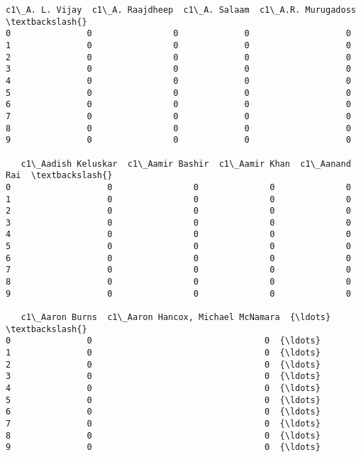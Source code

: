 \documentclass[11pt]{article}
\makeatletter
\newcommand{\boxspacing}{\kern\kvtcb@left@rule\kern\kvtcb@boxsep}
\newcommand{\prompt}[4]{
        {\ttfamily\llap{{\color{#2}[#3]:\hspace{3pt}#4}}\vspace{-\baselineskip}}
    }
\makeatother
\begin{document}
            \begin{tcolorbox}[breakable, size=fbox, boxrule=.5pt, pad at break*=1mm, opacityfill=0]
\prompt{Out}{outcolor}{78}{\boxspacing}
\begin{Verbatim}[commandchars=\\\{\}]
   c1\_A. L. Vijay  c1\_A. Raajdheep  c1\_A. Salaam  c1\_A.R. Murugadoss  \textbackslash{}
0               0                0             0                   0
1               0                0             0                   0
2               0                0             0                   0
3               0                0             0                   0
4               0                0             0                   0
5               0                0             0                   0
6               0                0             0                   0
7               0                0             0                   0
8               0                0             0                   0
9               0                0             0                   0

   c1\_Aadish Keluskar  c1\_Aamir Bashir  c1\_Aamir Khan  c1\_Aanand Rai  \textbackslash{}
0                   0                0              0              0
1                   0                0              0              0
2                   0                0              0              0
3                   0                0              0              0
4                   0                0              0              0
5                   0                0              0              0
6                   0                0              0              0
7                   0                0              0              0
8                   0                0              0              0
9                   0                0              0              0

   c1\_Aaron Burns  c1\_Aaron Hancox, Michael McNamara  {\ldots}  \textbackslash{}
0               0                                  0  {\ldots}
1               0                                  0  {\ldots}
2               0                                  0  {\ldots}
3               0                                  0  {\ldots}
4               0                                  0  {\ldots}
5               0                                  0  {\ldots}
6               0                                  0  {\ldots}
7               0                                  0  {\ldots}
8               0                                  0  {\ldots}
9               0                                  0  {\ldots}


\end{Verbatim}
\end{tcolorbox}
\end{document}
